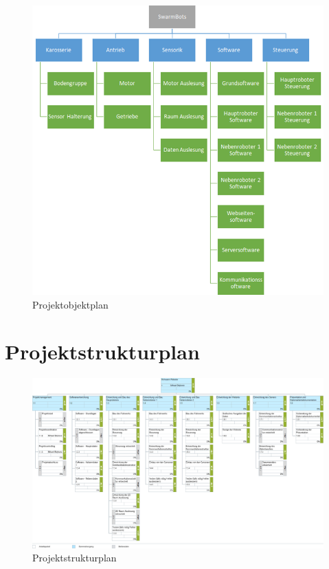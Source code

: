 \begin{figure}[H]
    \centering
    \includegraphics[width=\textwidth]{img/Projektobjektplan.png} 
    \caption{Projektobjektplan}
\end{figure}

\newpage

\section{Projektstrukturplan}

\begin{figure}[H]
    \centering
    \includegraphics[width=1.4\textwidth, angle=-90]{img/Projektstrukturplan.png}
    \caption{Projektstrukturplan}
    \label{fig:psp}
\end{figure}

